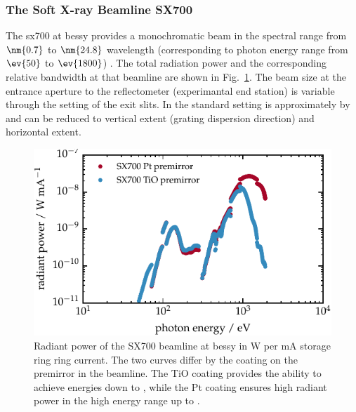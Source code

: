 \subsubsection{The Soft X-ray Beamline SX700}
The \gls{sx700} at \gls{bessy} provides a monochromatic beam in the spectral range from $\nm{0.7}$ to $\nm{24.8}$ wavelength (corresponding to photon energy range from $\ev{50}$ to $\ev{1800}$) \cite{beckhoff_quarter-century_2009}. The total radiation power and the corresponding relative bandwidth at that beamline are shown in Fig.~\ref{ch_exp:fig_flux_sx700}. The beam size at the entrance aperture to the reflectometer (experimantal end station) is variable through the setting of the exit slits. In the standard setting is approximately  by  \cite{scholze_high-accuracy_2001} and can be reduced to  vertical extent (grating dispersion direction) and  horizontal extent.
\begin{figure}[htb]
    \includegraphics{img/beamline_radiant_power.pdf}
    \caption[Radiant power of the SX700 beamline.]{Radiant power of the SX700 beamline at \gls{bessy} in W per mA storage ring ring current. The two curves differ by the coating on the premirror in the beamline. The TiO coating provides the ability to achieve energies down to , while the Pt coating ensures high radiant power in the high energy range up to .}
    \label{ch_exp:fig_flux_sx700}
\end{figure}

